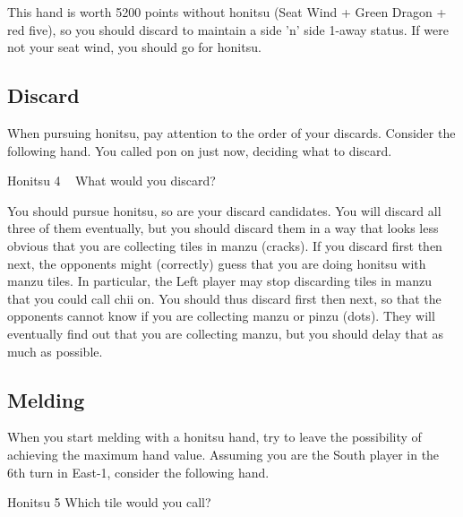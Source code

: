 \bigskip
\noindent This hand is worth 5200 points without {\jap honitsu} (Seat Wind + Green Dragon + red five), so you should discard {\LARGE{}} to maintain a side 'n' side 1-away status. If {\LARGE\nan} were not your seat wind, you should go for {\jap honitsu}.

\newpage
\subsection{Discard}
When pursuing {\jap honitsu}, pay attention to the order of your discards. 
Consider the following hand. You called {\jap pon} on {\LARGE\bai} just now, deciding what to discard. 
\begin{itembox}[r]{{\jap Honitsu} 4}
\bp
{}\bei\bei\zhong~\bai\bai\rbai
\ep
\vspace{-10pt}What would you discard? \vspace{-5pt}
\end{itembox}

\bigskip
\noindent You should pursue {\jap honitsu}, so {\LARGE{}} are your discard candidates. You will discard all three of them eventually, but you should discard them in a way that looks less obvious that you are collecting tiles in {\jap manzu} (cracks). 
If you discard {\LARGE{}} first then {\LARGE{}} next, the opponents might (correctly) guess that you are doing {\jap honitsu} with {\jap manzu} tiles. 
In particular, the Left player may stop discarding tiles in {\jap manzu} that you could call {\jap chii} on. You should thus discard {\LARGE{}} first then {\LARGE{}} next, so that the opponents cannot know if you are collecting {\jap manzu} or {\jap pinzu} (dots). They will eventually find out that you are collecting {\jap manzu}, but you should delay that as much as possible. 

\newpage
\subsection{Melding}
When you start melding with a {\jap honitsu} hand, try to leave the possibility of achieving the maximum hand value. Assuming you are the South player in the 6th turn in East-1, consider the following hand.

\begin{itembox}[r]{{\jap Honitsu} 5}
\bp
{}\xi\bei\bei\fa\fa
\ep
\vspace{-10pt}Which tile would you call? \vspace{-5pt}
\end{itembox}


